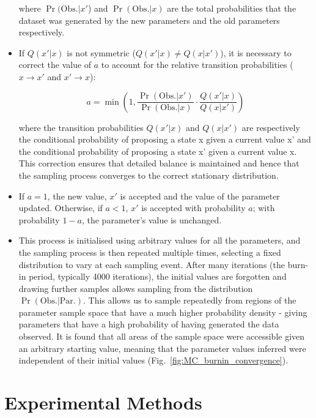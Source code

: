\begin{itemize}
where $\Pr(\text{Obs.} | x'$) and $\Pr(\text{Obs.} | x)$ are the total probabilities that the dataset was generated by the new parameters and the old parameters respectively.

\item If $Q(x'|x)$ is not symmetric ($Q(x'|x) \neq Q(x|x')$), it is necessary to correct the value of $a$ to account for the relative transition probabilities ($x \rightarrow x'$ and $x' \rightarrow x$): 

\begin{equation}
a = \min(1, \frac{\Pr(\text{Obs.} | x')}{\Pr(\text{Obs.} | x)} \cdot \frac{Q(x' | x)}{Q(x | x')})
\end {equation}

where the transition probabilities  $Q(x' | x)$ and $Q(x | x')$ are respectively the conditional probability of proposing a state x given a current value x' and the conditional probability of proposing a state x' given a current value x. This correction ensures that detailed balance is maintained and hence that the sampling process converges to the correct stationary distribution.

\item  If $a = 1$, the new value, $x'$ is accepted and the value of the parameter updated.  Otherwise, if $a < 1$, $x'$ is accepted with probability $a$; with probability $1 - a$, the parameter's value is unchanged.
\item This process is initialised using arbitrary values for all the parameters, and the sampling process is then repeated multiple times, selecting a fixed distribution to vary at each sampling event. After many iterations (the burn-in period, typically 4000 iterations), the initial values are forgotten and drawing further samples allows sampling from the distribution $\Pr(\text{Obs.} | \text{Par.})$.  This allows us to sample repeatedly from regions of the parameter sample space that have a much higher probability density - giving parameters that have a high probability of having generated the data observed. It is found that all areas of the sample space were accessible given an arbitrary starting value, meaning that the parameter values inferred were independent of their initial values (Fig.~\ref{fig:MC_burnin_convergence}).
\end{itemize}


\section{Experimental Methods}
